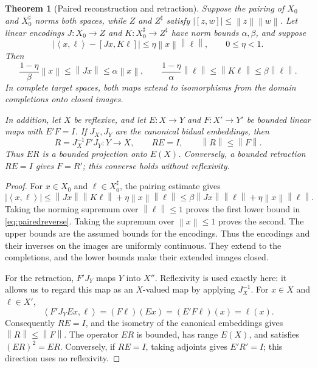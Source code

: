 \documentclass[11pt,a4paper]{amsart}
\numberwithin{equation}{section}
\newtheorem{theorem}{Theorem}[section]
\theoremstyle{definition}
\theoremstyle{remark}
\newcommand{\norm}[1]{\left\lVert#1\right\rVert}
\newcommand{\ip}[2]{\left\langle#1,#2\right\rangle}
\begin{document}
\begin{theorem}[Paired reconstruction and retraction]\label{thm:paired}
Suppose the pairing of $X_0$ and $X_0^\sharp$ norms both spaces, while $Z$ and $Z^\sharp$ satisfy $|[z,w]|\le\norm z\norm w$. Let linear encodings $J:X_0\to Z$ and $K:X_0^\sharp\to Z^\sharp$ have norm bounds $\alpha,\beta$, and suppose
\[
 |\ip{x}{\ell}-[Jx,K\ell]|
 \le\eta\norm x\norm\ell,\qquad0\le\eta<1.
\]
Then
\begin{equation}\label{eq:pairedreverse}
 \frac{1-\eta}{\beta}\norm x\le\norm{Jx}\le\alpha\norm x,
 \qquad
 \frac{1-\eta}{\alpha}\norm\ell\le\norm{K\ell}\le\beta\norm\ell.
\end{equation}
In complete target spaces, both maps extend to isomorphisms from the domain completions onto closed images.

In addition, let $X$ be reflexive, and let $E:X\to Y$ and $F:X'\to Y'$ be bounded linear maps with $E'F=I$. If $J_X,J_Y$ are the canonical bidual embeddings, then
\begin{equation}\label{eq:retract}
 R=J_X^{-1}F'J_Y:Y\to X,
 \qquad RE=I,\qquad\norm R\le\norm F.
\end{equation}
Thus $ER$ is a bounded projection onto $E(X)$. Conversely, a bounded retraction $RE=I$ gives $F=R'$; this converse holds without reflexivity.
\end{theorem}
\begin{proof}
For $x\in X_0$ and $\ell\in X_0^\sharp$, the pairing estimate gives
\[
 |\ip{x}{\ell}|
 \le\norm{Jx}\norm{K\ell}+\eta\norm x\norm\ell
 \le\beta\norm{Jx}\norm\ell+\eta\norm x\norm\ell.
\]
Taking the norming supremum over $\norm\ell\le1$ proves the first lower bound in \eqref{eq:pairedreverse}. Taking the supremum over $\norm x\le1$ proves the second. The upper bounds are the assumed bounds for the encodings. Thus the encodings and their inverses on the images are uniformly continuous. They extend to the completions, and the lower bounds make their extended images closed.

For the retraction, $F'J_Y$ maps $Y$ into $X''$. Reflexivity is used exactly here: it allows us to regard this map as an $X$-valued map by applying $J_X^{-1}$. For $x\in X$ and $\ell\in X'$,
\[
 \ip{F'J_YEx}{\ell}=(F\ell)(Ex)=(E'F\ell)(x)=\ell(x).
\]
Consequently $RE=I$, and the isometry of the canonical embeddings gives $\norm R\le\norm F$. The operator $ER$ is bounded, has range $E(X)$, and satisfies $(ER)^2=ER$. Conversely, if $RE=I$, taking adjoints gives $E'R'=I$; this direction uses no reflexivity.
\end{proof}
\end{document}
